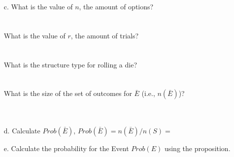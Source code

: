 {\begin{questionNOGRADE}{\thequestion}
\begin{enumerate}
                \item[c.]   What is the value of $n$, the amount of options?   ~\\ ~\\ ~\\ 
                            What is the value of $r$, the amount of trials?    ~\\ ~\\ ~\\ 
                            What is the structure type for rolling a die?      ~\\ ~\\ ~\\ 
                            What is the size of the set of outcomes for $\bar{E}$ (i.e., $n(\bar{E})$)? ~\\ ~\\ ~\\ 

                \item[d.] Calculate $Prob(\bar{E})$,  $Prob(\bar{E}) = n(\bar{E}) / n(S) =$ ~\\

                \item[e.] Calculate the probability for the Event $Prob(E)$ using the proposition.
            \end{enumerate}
        \end{questionNOGRADE}


}{

}

